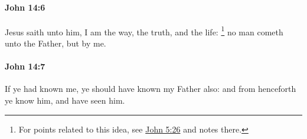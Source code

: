 		\paragraph{John 14:6} %
			\label{JOHN-14-6}

			Jesus saith unto him, I am the way, the truth, and the life:%
				\footnote{%
					For points related to this idea, see \hyperref[JOHN-5-26]{John 5:26} and notes there.
					}%
			no man cometh unto the Father, but by me.

			\begin{framed}
				\scriptsize
				\begin{compactdesc}
					\item[SBLG] 
				\end{compactdesc}
			\end{framed}

		\paragraph{John 14:7} %
			\label{JOHN-14-7}

			If ye had known me, ye should have known my Father also: and from henceforth ye know him, and have seen him.

